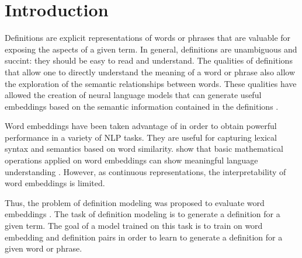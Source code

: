 \section{Introduction}
Definitions are explicit representations of words or phrases that are valuable
for exposing the aspects of a given term. In general, definitions are
unambiguous and succint: they should be easy to read and understand. The
qualities of definitions that allow one to directly understand the meaning of a
word or phrase also allow the exploration of the semantic relationships between
words. These qualities have allowed the creation of neural language models that
can generate useful embeddings based on the semantic information contained in
the definitions \cite{hill_learning_2016, bosc_auto_2018}.

Word embeddings have been taken advantage of in order to obtain powerful
performance in a variety of NLP tasks. They are useful for capturing lexical
syntax and semantics based on word similarity.
\citeauthor{mikolov_distributed_2013} show that basic mathematical operations
applied on word embeddings can show meaningful language understanding
\cite{mikolov_distributed_2013}. However, as continuous representations, the
interpretability of word embeddings is limited.

Thus, the problem of definition modeling was proposed to evaluate word
embeddings \cite{noraset_definition_2016}. The task of definition modeling is to
generate a definition for a given term. The goal of a model trained on this task
is to train on word embedding and definition pairs in order to learn to generate
a definition for a given word or phrase.
